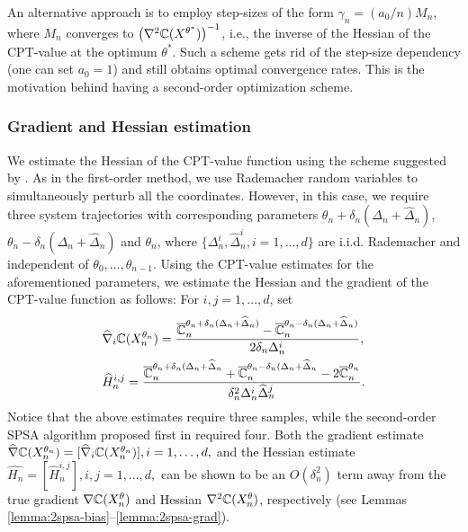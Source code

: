 An alternative approach is to employ step-sizes of the form $\gamma_n = (a_0/n) M_n$, where $M_n$ converges to $\left(\nabla^2 \mathbb{C}(X^{\theta^*})\right)^{-1}$, i.e., the inverse of the Hessian of the CPT-value at the optimum $\theta^*$. Such a scheme gets rid of the step-size dependency (one can set $a_0=1$) and still obtains optimal convergence rates. This is the motivation behind having a second-order optimization scheme.

\subsubsection*{Gradient and Hessian estimation}
We estimate the Hessian of the CPT-value function using the scheme suggested by \cite{bhatnagar2015simultaneous}. As in the first-order method, we use Rademacher random variables to simultaneously perturb all the coordinates. However, in this case, we require three system trajectories with corresponding  parameters $\theta_n+\delta_n(\Delta_n+\widehat\Delta_n)$, $\theta_n-\delta_n(\Delta_n+\widehat\Delta_n)$ and $\theta_n$, where $\{\Delta_n^i, \widehat\Delta_n^i, i=1,\ldots,d\}$ are i.i.d. Rademacher and independent of $\theta_0,\ldots,\theta_{n-1}$. Using the CPT-value estimates for the aforementioned  parameters, we estimate the Hessian and the gradient of the CPT-value function as follows: For $i,j=1,\ldots,d$, set
\begin{align*}
&\widehat \nabla_{i} \mathbb{C}(X_n^{\theta_n})=\dfrac{\overline {\mathbb{C}}_n^{\theta_n+\delta_n(\Delta_n+\widehat\Delta_n)} - \overline {\mathbb{C}}_n^{\theta_n-\delta_n(\Delta_n+\widehat\Delta_n)}}{2\delta_n \Delta_n^{i}},\\ 
&\widehat H_n^{i,j}=\dfrac{\overline {\mathbb{C}}_n^{\theta_n+\delta_n(\Delta_n+\widehat\Delta_n} + \overline {\mathbb{C}}_n^{\theta_n-\delta_n(\Delta_n+\widehat\Delta_n} - 2\overline {\mathbb{C}}_n^{\theta_n}}{\delta_n^2 \Delta_n^{i}\widehat\Delta_n^{j}}.
\end{align*}
Notice that the above estimates require three samples, while the second-order SPSA algorithm proposed first in \cite{spall2000adaptive} required four.
%
Both the gradient estimate $\widehat \nabla \mathbb{C}(X_n^{\theta_n}) = [\widehat \nabla_i \mathbb{C}(X_n^{\theta_n})], i=1,\ldots,d,$ and the Hessian estimate $\widehat{H_n} = [\widehat H_n^{i,j}], i,j=1,\ldots,d,$ can be shown to be an $O(\delta_n^2)$ term away from the true gradient $\nabla \mathbb{C}(X^\theta_n)$ and Hessian $\nabla^2  \mathbb{C}(X^\theta_n)$, respectively (see Lemmas \ref{lemma:2spsa-bias}--\ref{lemma:2spsa-grad}).

%
%

